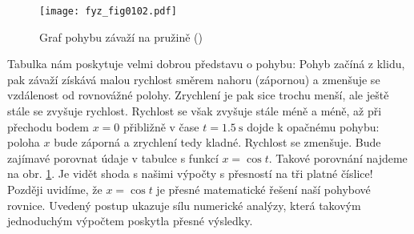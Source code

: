     
    \begin{figure}[ht!]  %
      \centering
      \texttt{[image: fyz\_fig0102.pdf]}
      \caption{Graf pohybu závaží na pružině (\cite[s.~129]{Feynman01})}
      \label{fyz:fig0102}
    \end{figure}
    
    Tabulka nám poskytuje velmi dobrou představu o pohybu: Pohyb začíná z klidu, pak závaží získává 
    malou rychlost směrem nahoru (zápornou) a zmenšuje se vzdálenost od rovnovážné polohy. 
    Zrychlení je pak sice trochu menší, ale ještě stále se zvyšuje rychlost. Rychlost se však 
    zvyšuje stále méně a méně, až při přechodu bodem \(x = 0\) přibližně v čase \(t = 
    \SI{1.5}{\s}\) dojde k opačnému pohybu: poloha \(x\) bude záporná a zrychlení tedy kladné. 
    Rychlost se zmenšuje. Bude zajímavé porovnat údaje v tabulce s funkcí \(x = \cos t\). Takové 
    porovnání najdeme na obr. \ref{fyz:fig0102}. Je vidět shoda s našimi výpočty s přesností na tři 
    platné číslice! Později uvidíme, že \(x = \cos t\) je přesné matematické řešení naší pohybové 
    rovnice. Uvedený postup ukazuje sílu numerické analýzy, která takovým jednoduchým výpočtem 
    poskytla přesné výsledky.
    

